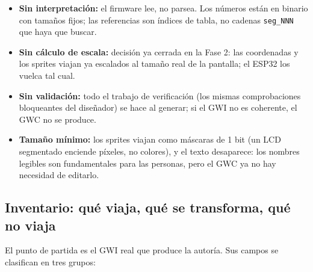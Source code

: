 \begin{itemize}
	\item \textbf{Sin interpretación:} el firmware lee, no parsea. Los
	números están en binario con tamaños fijos; las referencias son
	índices de tabla, no cadenas \texttt{seg\_NNN} que haya que buscar.
	
	\item \textbf{Sin cálculo de escala:} decisión ya cerrada en la Fase
	2: las coordenadas y los sprites viajan ya escalados al tamaño real
	de la pantalla; el ESP32 los vuelca tal cual.
	
	\item \textbf{Sin validación:} todo el trabajo de verificación (los
	mismas comprobaciones bloqueantes del diseñador) se hace al generar;
	si el GWI no es coherente, el GWC no se produce.
	
	\item \textbf{Tamaño mínimo:} los sprites viajan como máscaras de
	1 bit (un LCD segmentado enciende píxeles, no colores), y el texto
	desaparece: los nombres legibles son fundamentales para las personas, pero el GWC
	ya no hay necesidad de editarlo.
\end{itemize}

\subsection{Inventario: qué viaja, qué se transforma, qué no viaja}
\label{sec:F5Inventario}

El punto de partida es el GWI real que produce la autoría. Sus
campos se clasifican en tres grupos:


